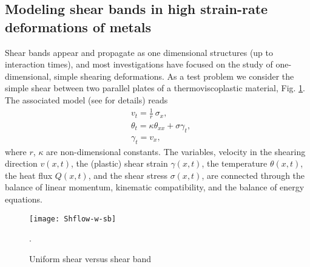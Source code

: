 \documentclass[a4paper,11pt]{article}
\theoremstyle{remark}
\begin{document}
\subsection{Modeling shear bands in high strain-rate deformations of metals}
Shear bands appear and propagate as one dimensional structures (up to interaction times), and
most investigations have focused on the study of one-dimensional, simple shearing deformations. 
As a test problem we consider the simple shear between two parallel plates of a 
thermoviscoplastic material,  Fig. \ref{ShearFlow}. The associated model 
(see \cite{CDHS,WW,KT} for details) reads
\begin{equation}
  \label{sbeq}
  \begin{aligned}
    & v_{t} = \frac{1}{r}\ \sigma_{x},\\
    & \theta_{t} = \kappa \theta_{ x x}  +  \sigma \gamma_{t}, \\
    & \gamma_{t} = v_{x}, 
  \end{aligned}
\end{equation}
where $r$, $\kappa$ are non-dimensional constants. The variables,
velocity in the shearing direction $v(x,t)$, 
the (plastic) shear strain $\gamma (x,t)$, the temperature $\theta(x,t)$, the heat flux $Q(x,t)$, and the 
shear stress $\sigma(x,t)$, are connected through the balance of linear momentum,
kinematic compatibility, and the balance of energy equations.


\begin{figure}
\centering
\vspace{-0.1cm}
\texttt{[image: Shflow-w-sb]}
\vspace{0.1cm}
\caption{Uniform shear versus shear band}.
\label{ShearFlow}
\end{figure}
\end{document}
